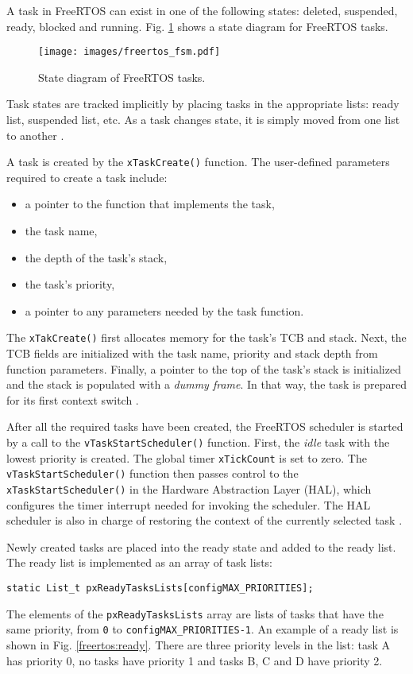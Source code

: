 A task in FreeRTOS can exist in one of the following states: deleted, suspended, ready, blocked and running. 
Fig. \ref{freertos:state} shows a state diagram for FreeRTOS tasks. 

\begin{figure}[ht]
    \centering
    \texttt{[image: images/freertos\_fsm.pdf]}
    \caption{State diagram of FreeRTOS tasks.}
    \label{freertos:state}
\end{figure}

Task states are tracked implicitly by placing tasks in the appropriate lists: ready list, suspended list, etc. As a task changes state, it is simply moved from one list to another 
\cite{brown2012architecture}.

A task is created by the \verb$xTaskCreate()$ function. 
The user-defined parameters required to create a task include: 
\begin{itemize}
	\item a pointer to the function that implements the task,
	\item the task name,
	\item the depth of the task's stack,
	\item the task's priority,
	\item a pointer to any parameters needed by the task function.
\end{itemize}
The \verb$xTakCreate()$ first allocates memory for the task's TCB and stack.
Next, the TCB fields are initialized with the task name, priority and stack depth from function parameters. 
Finally, a pointer to the top of the task's stack is initialized and the stack is populated with a \textit{dummy frame}. 
In that way, the task is prepared for its first context switch \cite{goyette2007analysis}.

After all the required tasks have been created, the FreeRTOS scheduler is started by a call to the 
\verb$vTaskStartScheduler()$ function. 
First, the \textit{idle} task with the lowest priority is created.
The global timer \verb$xTickCount$ is set to zero. 
The \verb$vTaskStartScheduler()$ function then passes control to the \verb$xTaskStartScheduler()$ in the Hardware Abstraction Layer (HAL), which configures the timer interrupt needed for invoking the scheduler. 
The HAL scheduler is also in charge of restoring the context of the currently selected task
\cite{goyette2007analysis}. 

Newly created tasks are placed into the ready state and added to the ready list. 
The ready list is implemented as an array of task lists:
\begin{lstlisting}[frame=none, label={lst:readylist}, caption={Ready task list}, captionpos=b]
static List_t pxReadyTasksLists[configMAX_PRIORITIES];
\end{lstlisting}
The elements of the \verb$pxReadyTasksLists$ array are lists of tasks that have the same priority, from \verb$0$ to \verb$configMAX_PRIORITIES-1$.
An example of a ready list is shown in Fig. \ref{freertos:ready}.
There are three priority levels in the list: task A has priority 0, no tasks have priority 1 and tasks B, C and D have priority 2. 

